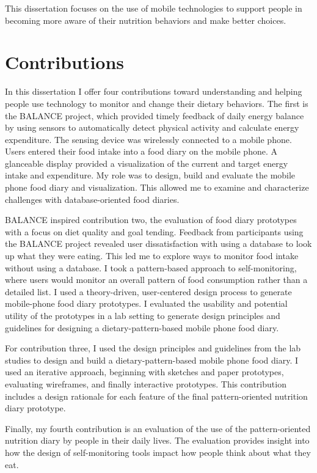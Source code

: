 This dissertation focuses on the use of mobile technologies to support people in becoming more aware of their nutrition behaviors and make better choices. 

\section{Contributions}
In this dissertation I offer four contributions toward understanding and helping people use technology to monitor and change their dietary behaviors. The first is the BALANCE project, which provided timely feedback of daily energy balance by using sensors to automatically detect physical activity and calculate energy expenditure. The sensing device was wirelessly connected to a mobile phone. Users entered their food intake into a food diary on the mobile phone. A glanceable display provided a visualization of the current and target energy intake and expenditure. My role was to design, build and evaluate the mobile phone food diary and visualization. This allowed me to examine and characterize challenges with database-oriented food diaries.  

BALANCE inspired contribution two, the evaluation of food diary prototypes with a focus on diet quality and goal tending. Feedback from participants using the BALANCE project revealed user dissatisfaction with using a database to look up what they were eating. This led me to explore ways to monitor food intake without using a database. I took a pattern-based approach to self-monitoring, where users would monitor an overall pattern of food consumption rather than a detailed list. I used a theory-driven, user-centered design process to generate mobile-phone food diary prototypes. I evaluated the usability and potential utility of the prototypes in a lab setting to generate design principles and guidelines for designing a dietary-pattern-based mobile phone food diary. 

For contribution three, I used the design principles and guidelines from the lab studies to design and build a dietary-pattern-based mobile phone food diary. I used an iterative approach, beginning with sketches and paper prototypes, evaluating wireframes, and finally interactive prototypes. This contribution includes a design rationale for each feature of the final pattern-oriented nutrition diary prototype. 

Finally, my fourth contribution is an evaluation of the use of the pattern-oriented nutrition diary by people in their daily lives. The evaluation provides insight into how the design of self-monitoring tools impact how people think about what they eat. 

